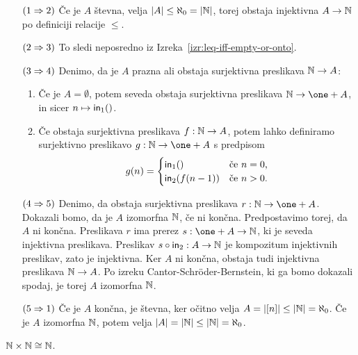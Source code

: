 \begin{dokaz}
%
\begin{itemize}
\item[$(1 \Rightarrow 2)$]
%
Če je $A$ števna, velja $|A| \leq \aleph_0 = |\mathbb{N}|$, torej obstaja injektivna $A \to
\mathbb{N}$ po definiciji relacije $\leq$.

\item[$(2 \Rightarrow 3)$]
%
To sledi neposredno iz Izreka~\ref{izr:leq-iff-empty-or-onto}.

\item[$(3 \Rightarrow 4)$]
%
Denimo, da je $A$ prazna ali obstaja surjektivna preslikava $\mathbb{N} \to A$:
%
\begin{enumerate}
\item
  Če je $A = \emptyset$, potem seveda obstaja surjektivna preslikava $\NN \to \one + A$, in sicer
  $n \mapsto \mathsf{in}_{1} ()$.
\item 
  Če obstaja surjektivna preslikava $f : \mathbb{N} \to A$, potem lahko definiramo surjektivno
  preslikavo $g : \NN \to \one + A$ s predpisom
  \begin{equation*}
    g(n) =
    \begin{cases}
      \mathsf{in}_{1} ()      &\text{če $n = 0$,}\\
      \mathsf{in}_{2} (f(n-1))   &\text{če $n > 0$.}
    \end{cases}
  \end{equation*}
\end{enumerate}

\item[$(4 \Rightarrow 5)$]
%
Denimo, da obstaja surjektivna preslikava $r : \NN \to \one + A$.
Dokazali bomo, da je $A$ izomorfna $\mathbb{N}$, če ni končna.
Predpostavimo torej, da $A$ ni končna.
Preslikava $r$ ima prerez $s : \one + A \to \NN$, ki je seveda injektivna preslikava.
Preslikav $s \circ \mathsf{in}_{2} : A \to \mathbb{N}$ je kompozitum injektivnih preslikav, zato je injektivna.
Ker $A$ ni končna, obstaja tudi injektivna preslikava $\mathbb{N} \to A$.
Po izreku Cantor-Schröder-Bernstein, ki ga bomo dokazali spodaj, je torej $A$ izomorfna $\mathbb{N}$.

\item[$(5 \Rightarrow 1)$]
%
Če je $A$ končna, je števna, ker očitno velja $A = |[n]| \leq |\mathbb{N}| = \aleph_0$.
Če je $A$ izomorfna $\mathbb{N}$, potem velja $|A| = |\mathbb{N}| \leq |\mathbb{N}| = \aleph_0$.
\end{itemize}
\end{dokaz}

\begin{izrek}
  $\mathbb{N} \times \mathbb{N} \cong \mathbb{N}$.
\end{izrek}

